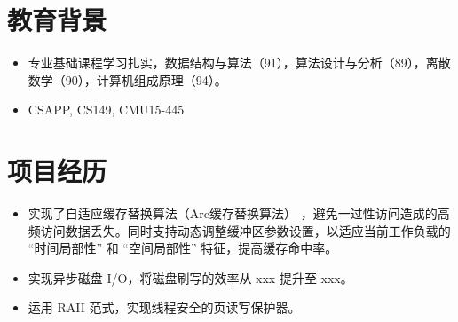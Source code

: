 \documentclass{resume}
\begin{document}




\sepspace
{}


\section{教育背景}
\begin{itemize}
  \item 专业基础课程学习扎实，数据结构与算法（91），算法设计与分析（89），离散数学（90），计算机组成原理（94）。 
  \item CSAPP, CS149, CMU15-445
\end{itemize}

\section{项目经历}
\begin{itemize}
  \item 实现了自适应缓存替换算法（Arc缓存替换算法） ，避免一过性访问造成的高频访问数据丢失。同时支持动态调整缓冲区参数设置，以适应当前工作负载的 “时间局部性” 和 “空间局部性” 特征，提高缓存命中率。
  \item 实现异步磁盘 I/O，将磁盘刷写的效率从 xxx 提升至 xxx。
  \item 运用 RAII 范式，实现线程安全的页读写保护器。
\end{itemize}
\end{document}
